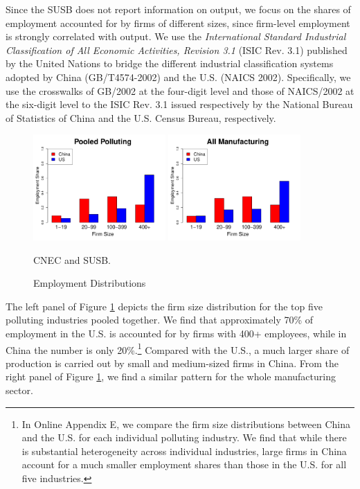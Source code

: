 \documentclass[AEJ]{AEA}
\begin{document}
Since the SUSB does not report information on output, we focus on the shares of employment accounted for by firms of different sizes, since firm-level employment is strongly correlated with output. We use the \textit{International Standard Industrial Classification of All Economic Activities, Revision 3.1} (ISIC Rev. 3.1) published by the United Nations to bridge the different industrial classification systems adopted by China (GB/T4574-2002) and the U.S. (NAICS 2002). Specifically, we use the crosswalks of GB/2002 at the four-digit level and those of NAICS/2002 at the six-digit level to the ISIC Rev. 3.1 issued respectively by the National Bureau of Statistics of China and the U.S. Census Bureau, respectively.
\begin{figure}[t]
    \begin{center}
    \includegraphics[width=0.45\textwidth]{./Figures/poolES_R_1.pdf}
    \includegraphics[width=0.45\textwidth]{./Figures/allES_R_1.pdf}
    \caption{Employment Distributions}
    \begin{figurenotes}[Sources]
        CNEC and SUSB.
    \end{figurenotes}
    \label{fig:es}
    \end{center}
\end{figure}

The left panel of Figure \ref{fig:es} depicts the firm size distribution for the top five polluting industries pooled together. We find that approximately 70\% of employment in the U.S. is accounted for by firms with 400+ employees, while in China the number is only 20\%.\footnote{In Online Appendix E, we compare the firm size distributions between China and the U.S. for each individual polluting industry. We find that while there is substantial heterogeneity across individual industries, large firms in China account for a much smaller employment shares than those in the U.S. for all five industries.}
Compared with the U.S., a much larger share of production is carried out by small and medium-sized firms in China. From the right panel of Figure \ref{fig:es}, we find a similar pattern for the whole manufacturing sector.
\end{document}
